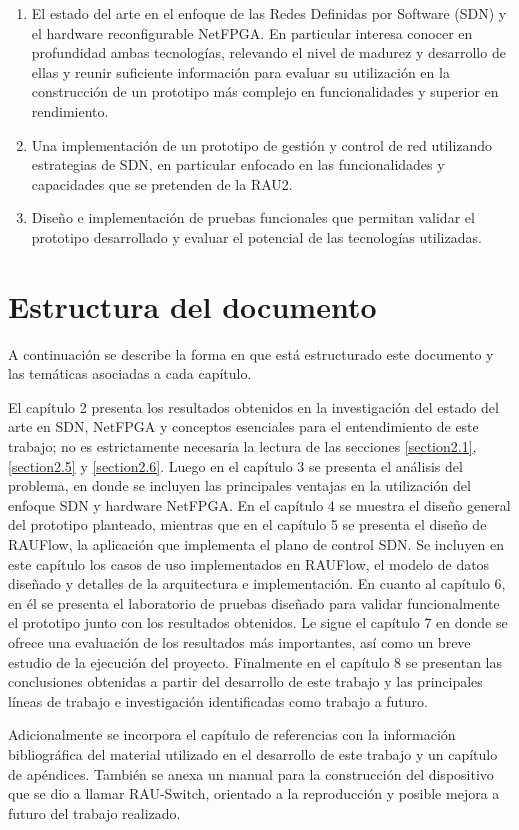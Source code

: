 \begin{enumerate}
\item El estado del arte en el enfoque de las Redes Definidas por Software (SDN) y el hardware reconfigurable NetFPGA. En particular interesa conocer en profundidad ambas tecnologías, relevando el nivel de madurez y desarrollo de ellas y reunir suficiente información para evaluar su utilización en la construcción de un prototipo m\'as complejo en funcionalidades y superior en rendimiento.

\item Una implementaci\'on de un prototipo de gesti\'on y control de red utilizando estrategias de SDN, en particular enfocado en las funcionalidades y capacidades que se pretenden de la RAU2.

\item Diseño e implementación de pruebas funcionales que permitan validar el prototipo desarrollado y evaluar el potencial de las tecnologías utilizadas.

\end{enumerate}

\section{Estructura del documento}

A continuación se describe la forma en que est\'a estructurado este documento y las temáticas asociadas a cada cap\'itulo.

El cap\'itulo 2 presenta los resultados obtenidos en la investigación del estado del arte en SDN, NetFPGA y conceptos esenciales para el entendimiento de este trabajo; no es estrictamente necesaria la lectura de las secciones \ref{section2.1},\ref{section2.5} y \ref{section2.6}. Luego en el cap\'itulo 3 se presenta el análisis del problema, en donde se incluyen las principales ventajas en la utilización del enfoque SDN y hardware NetFPGA. En el cap\'itulo 4 se muestra el diseño general del prototipo planteado, mientras que en el cap\'itulo 5 se presenta el diseño de RAUFlow, la aplicaci\'on que implementa el plano de control SDN. Se incluyen en este cap\'itulo los casos de uso implementados en RAUFlow, el modelo de datos diseñado y detalles de la arquitectura e implementaci\'on. En cuanto al cap\'itulo 6, en \'el se presenta el laboratorio de pruebas diseñado para validar funcionalmente el prototipo junto con los resultados obtenidos. Le sigue el cap\'itulo 7 en donde se ofrece una evaluación de los resultados m\'as importantes, así como un breve estudio de la ejecuci\'on del proyecto. Finalmente en el cap\'itulo 8 se presentan las conclusiones obtenidas a partir del desarrollo de este trabajo y las principales l\'ineas de trabajo e investigaci\'on identificadas como trabajo a futuro.

Adicionalmente se incorpora el cap\'itulo de referencias con la informaci\'on bibliográfica del material utilizado en el desarrollo de este trabajo y un cap\'itulo de ap\'endices. Tambi\'en se anexa un manual para la construcci\'on del dispositivo que se dio a llamar RAU-Switch, orientado a la reproducci\'on y posible mejora a futuro del trabajo realizado.
